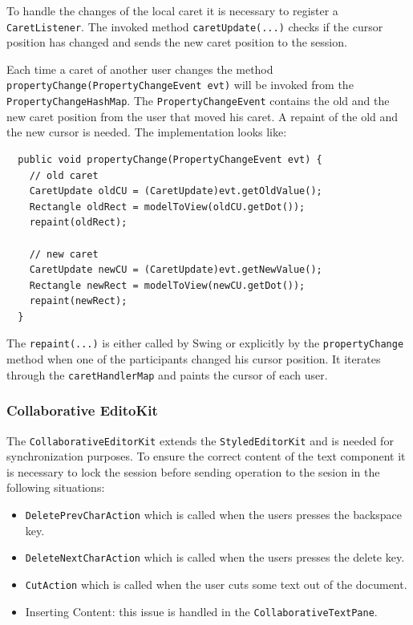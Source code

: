To handle the changes of the local caret it is necessary to register a \texttt{CaretListener}. The invoked method \texttt{caretUpdate(...)} checks if the cursor position has changed and sends the new caret position to the session.

Each time a caret of another user changes the method \texttt{propertyChange(PropertyChangeEvent evt)} will be invoked from the \texttt{Property\-Change\-Hash\-Map}. The \texttt{Property\-Change\-Event} contains the old and the new caret position from the user that moved his caret. A repaint of the old and the new cursor is needed. The implementation looks like:

\begin{verbatim}
  public void propertyChange(PropertyChangeEvent evt) {
    // old caret
    CaretUpdate oldCU = (CaretUpdate)evt.getOldValue();
    Rectangle oldRect = modelToView(oldCU.getDot());
    repaint(oldRect);

    // new caret
    CaretUpdate newCU = (CaretUpdate)evt.getNewValue();
    Rectangle newRect = modelToView(newCU.getDot());
    repaint(newRect);
  }
\end{verbatim}

The \texttt{repaint(...)} is either called by Swing or explicitly by the \texttt{propertyChange} method when one of the participants changed his cursor position. It iterates through the \texttt{caretHandlerMap} and paints the cursor of each user.

\subsubsection{Collaborative EditoKit}
\label{collaborative_editor_kit}
The \texttt{Collaborative\-Editor\-Kit} extends the \texttt{Styled\-Editor\-Kit} and is needed for synchronization purposes. To ensure the correct content of the text component it is necessary to lock the session before sending operation to the sesion in the following situations:

\begin{itemize}
\item \texttt{DeletePrevCharAction} which is called when the users presses the backspace key.
\item \texttt{DeleteNextCharAction} which is called when the users presses the delete key.
\item \texttt{CutAction} which is called when the user cuts some text out of the document.
\item Inserting Content: this issue is handled in the \texttt{Collaborative\-Text\-Pane}.
\end{itemize}

